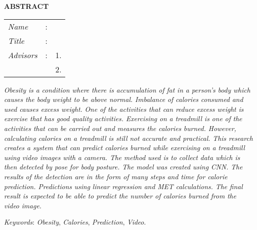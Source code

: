 \begin{center}
  \large\textbf{ABSTRACT}
\end{center}


\vspace{2ex}

\begingroup
\setlength{\tabcolsep}{0pt}

\noindent
\begin{tabularx}{\textwidth}{l >{\centering}m{3em} X}
  \emph{Name}     & : & \name{}         \\

  \emph{Title}    & : & \engtatitle{}   \\

  \emph{Advisors} & : & 1. \advisor{}   \\
                  &   & 2. \coadvisor{} \\
\end{tabularx}
\endgroup

\emph{Obesity is a condition where there is accumulation of fat in a person's body which causes the body weight to be above normal. Imbalance of calories consumed and used causes excess weight. One of the activities that can reduce excess weight is exercise that has good quality activities. Exercising on a treadmill is one of the activities that can be carried out and measures the calories burned. However, calculating calories on a treadmill is still not accurate and practical. This research creates a system that can predict calories burned while exercising on a treadmill using video images with a camera. The method used is to collect data which is then detected by pose for body posture. The model was created using CNN. The results of the detection are in the form of many steps and time for calorie prediction. Predictions using linear regression and MET calculations. The final result is expected to be able to predict the number of calories burned from the video image.}

\emph{Keywords}: \emph{Obesity}, \emph{Calories}, \emph{Prediction}, \emph{Video}.
